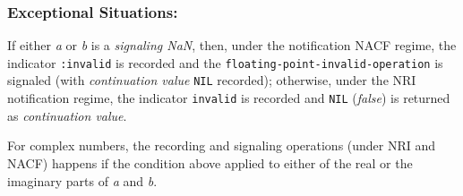 \documentclass[10pt,fleqn]{article}
\newcommand{\CL}{\textsf{Common~Lisp}}
\newcommand{\code}[1]{\texttt{#1}}
\newcommand{\clieeeterm}[1]{\textit{#1}}
\newcommand{\varname}[1]{\textit{#1}}
\newcommand{\clterm}[1]{\textit{#1}}
\newcommand{\RArrow}{$\Rightarrow$}
\newcommand{\DDictionaryItem}[1]{\vspace*{6pt}\noindent\hrulefill\vspace*{-9pt}\subsection*{#1}}
\newcommand{\DSyntax}{\subsubsection*{Syntax:}}
\newcommand{\DArgsNValues}{\subsubsection*{Arguments and Values:}}
\newcommand{\DDescription}{\subsubsection*{Description:}}
\newcommand{\DExceptional}{\subsubsection*{Exceptional Situations:}}
\begin{document}
\DExceptional{}

If either \varname {a} or \varname {b} is a \clieeeterm{signaling
  NaN}, then, under the notification NACF regime, the indicator
\code{:invalid} is recorded and the
\code{floating-point-invalid-operation} is signaled (with
\emph{continuation value} \code{NIL} recorded); otherwise, under the
NRI notification regime, the indicator \code{invalid} is recorded and
\code{NIL} (\varname{false}) is returned as \emph{continuation value}.

For complex numbers, the recording and signaling operations (under NRI
and NACF) happens if the condition above applied to either of the real
or the imaginary parts of \varname{a} and \varname{b}.










\end{document}
